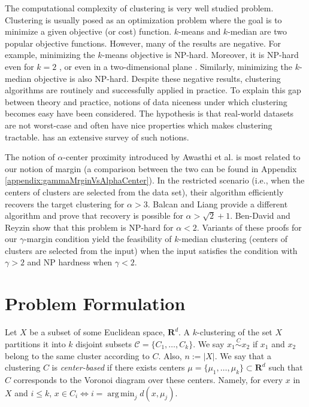 \documentclass[12pt]{article}
\newcommand{\mc}{\mathcal}
\newcommand{\mb}{\mathbf}
\DeclareMathOperator*{\argmin}{arg\,min}
\begin{document}
The computational complexity of clustering is very well studied problem. Clustering is usually posed as an optimization problem where the goal is to minimize a given objective (or cost) function. $k$-means and $k$-median are two popular objective functions. However, many of the results are negative. For example, minimizing the $k$-means objective is NP-hard. Moreover, it is NP-hard even for $k=2$ \cite{dasgupta2008hardness}, or even in a two-dimensional plane \cite{vattani2009hardness,mahajan2009planar}. Similarly, minimizing the $k$-median objective is also NP-hard. Despite these negative results, clustering algorithms are routinely and successfully applied in practice. To explain this gap between theory and practice, notions of data niceness under which clustering becomes easy have been considered. The hypothesis is that real-world datasets are not worst-case and often have nice properties which makes clustering tractable. \cite{Ben-David15} has an extensive survey of such notions.

The notion of $\alpha$-center proximity introduced by Awasthi et al. \cite{awasthi2012center} is most related to our notion of margin (a comparison between the two can be found in Appendix \ref{appendix:gammaMrginVsAlphaCenter}). In the restricted scenario (i.e., when the centers of clusters are selected from the data set), their algorithm efficiently recovers the target clustering for $\alpha > 3$.  Balcan and Liang \cite{balcan2012clustering} provide a different algorithm and prove that recovery is possible for $\alpha > \sqrt{2} + 1$. Ben-David and Reyzin \cite{ben2014data} show that this problem is NP-hard for $\alpha < 2$. Variants of these proofs for our $\gamma$-margin condition yield the feasibility of $k$-median clustering (centers of clusters are selected from the input) when the input satisfies the condition with $\gamma >2$ and NP hardness when $\gamma <2$.


\section{Problem Formulation}

Let $X$ be a subset of some Euclidean space, $\mb{R}^d$. A $k$-clustering of the set $X$ partitions it into $k$ disjoint subsets $\mc C = \{C_1, \ldots, C_k\}$. We say $x_1 \overset{C}{\sim} x_2$ if $x_1$ and $x_2$ belong to the same cluster according to $C$. Also, $n := |X|$. We say that a clustering $C$ is \emph{center-based} if there exists centers $\mu = \{\mu_1, \ldots, \mu_k\} \subset \mb R^d$ such that $C$ corresponds to the Voronoi diagram over these centers. Namely, for every $x$ in $X$ and $i \leq k$,  $x\in C_i \Leftrightarrow i=\argmin_j d(x,\mu_j)$. 
\end{document}
